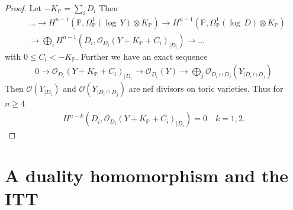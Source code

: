 \documentclass[12pt, english]{article}
\begin{document}
\begin{proof}
	Let $-K_{\mathbb{P}} = \sum\limits_{i} D_i$ Then
	\begin{align*}
		&... \rightarrow H^{n-1}(\mathbb{P}, \Omega_{\mathbb{P}}^1(\log \, Y) \otimes K_{\mathbb{P}}) \rightarrow H^{n-1}(\mathbb{P}, \Omega_{\mathbb{P}}^1(\log \, D) \otimes K_{\mathbb{P}}) \\
		&\rightarrow \bigoplus_{i} H^{n-1}(D_i, \mathcal{O}_{D_i}(Y + K_{\mathbb{P}} + C_i)_{\vert{D_i}}) \rightarrow ...
	\end{align*}
	with $0 \leq C_i < -K_{\mathbb{P}}$. Further we have an exact sequence
	\begin{align*}
		0 \rightarrow \mathcal{O}_{D_i}(Y+K_{\mathbb{P}} + C_i)_{\vert{D_i}} \rightarrow \mathcal{O}_{D_i}(Y) \rightarrow \bigoplus_{j} \mathcal{O}_{D_i \cap D_j}(Y_{\vert{D_i \cap D_j}})
	\end{align*}
	Then $\mathcal{O}(Y_{\vert{D_i}})$ and $\mathcal{O}(Y_{\vert{D_i \cap D_j}})$ are nef divisors on toric varieties. Thus for $n \geq 4$
	\begin{align*}
		H^{n-k}(D_i, \mathcal{O}_{D_i}(Y + K_{\mathbb{P}} + C_i)_{\vert{D_i}}) = 0 \quad k=1,2.
	\end{align*}
	

	
\end{proof}

\section{A duality homomorphism and the ITT}
\label{section_ITT_on_coker_computation_2}
\end{document}

